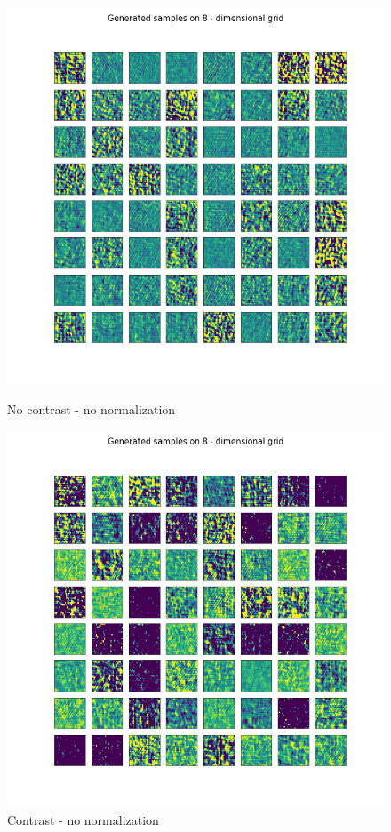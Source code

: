 \documentclass[12pt, english]{article}
\begin{document}
\begin{figure}[H] 
  \begin{minipage}{0.5\linewidth}
    \centering
    \includegraphics[width=.75\linewidth]{contrast/generated_samples_noContrastNorm_noContrast.png} 
    \caption{No contrast - no normalization} 
    \label{fig:contrast-generated-1} 
  \end{minipage}%
  \begin{minipage}{0.5\linewidth}
    \centering
    \includegraphics[width=.75\linewidth]{contrast/generated_samples_noContrastNorm_contrast.png} 
    \caption{Contrast - no normalization} 
    \label{fig:contrast-generated-2} 
  \end{minipage} 
  \begin{minipage}{0.5\linewidth}

\end{minipage}
\end{figure}
\end{document}
